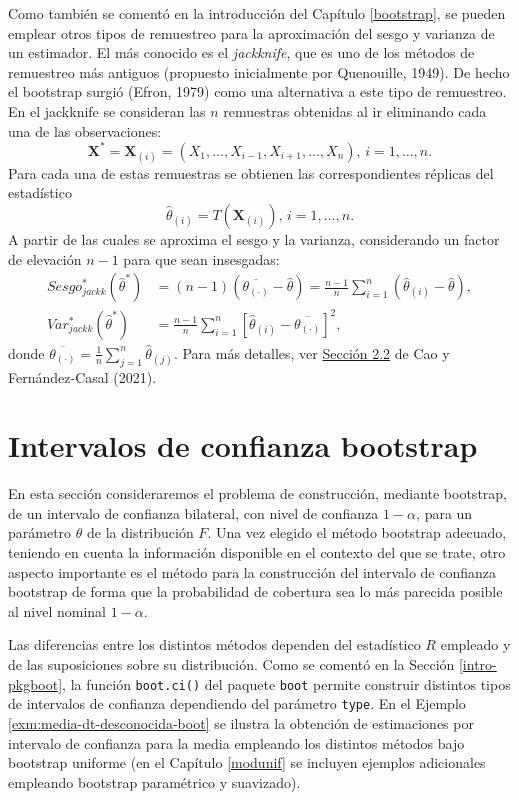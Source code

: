 \documentclass[
  spanish,
  10pt,
]{book}
\renewcommand{\mathbf}[1]{\symbf{#1}}
\theoremstyle{break}
\theoremstyle{nonumberplain}
\begin{document}
Como también se comentó en la introducción del Capítulo \ref{bootstrap}, se pueden emplear otros tipos de remuestreo para la aproximación del sesgo y varianza de un estimador.
El más conocido es el \emph{jackknife}, que es uno de los métodos de remuestreo más antiguos (propuesto inicialmente por Quenouille, 1949).
De hecho el bootstrap surgió (Efron, 1979) como una alternativa a este tipo de remuestreo.
En el jackknife se consideran las \(n\) remuestras obtenidas al ir eliminando cada una de las observaciones:
\[\mathbf{X}^{\ast}= \mathbf{X}_{(i)}=\left( X_1,\ldots ,X_{i-1},X_{i+1},\ldots
,X_n \right) \text{,  } i=1,\ldots ,n.\]
Para cada una de estas remuestras se obtienen las correspondientes réplicas del estadístico
\[\hat \theta_{(i)} = T \left( \mathbf{X}_{(i)} \right) \text{,  } i=1,\ldots ,n.\]
A partir de las cuales se aproxima el sesgo y la varianza, considerando un factor de elevación \(n-1\) para que sean insesgadas:
\[\begin{aligned}
Sesgo_{jackk}^{\ast}\left( \hat{\theta}^{\ast} \right) 
&= \left( n-1 \right)\left( \overline{\theta_{(\cdot)}}-\hat{\theta} \right) 
= \frac{n-1}{n}\sum_{i=1}^{n}\left( \hat \theta_{(i)} - \hat{\theta} \right), \\
Var_{jackk}^{\ast}\left( \hat{\theta}^{\ast} \right) 
&= \frac{n-1}{n} \sum_{i=1}^{n}\left[ \hat \theta_{(i)} 
- \overline{\theta_{(\cdot)}}\right]^2,
\end{aligned}\]
donde \(\overline{\theta_{(\cdot)}} = \frac{1}{n}\sum_{j=1}^{n}\hat \theta_{(j)}\).
Para más detalles, ver \href{https://rubenfcasal.github.io/book_remuestreo/jackknife.html}{Sección 2.2} de Cao y Fernández-Casal (2021).

\section{Intervalos de confianza bootstrap}\label{boot-ic}

En esta sección consideraremos el problema de construcción, mediante bootstrap, de un intervalo de confianza bilateral, con nivel de confianza \(1-\alpha\), para un parámetro \(\theta\) de la distribución \(F\).
Una vez elegido el método bootstrap adecuado, teniendo en cuenta la información disponible en el contexto del que se trate, otro aspecto importante es el método para la construcción del intervalo de confianza bootstrap de forma que la probabilidad de cobertura sea lo más parecida posible al nivel nominal \(1-\alpha\).

Las diferencias entre los distintos métodos dependen del estadístico \(R\) empleado y de las suposiciones sobre su distribución.
Como se comentó en la Sección \ref{intro-pkgboot}, la función \texttt{boot.ci()} del paquete \texttt{boot} permite construir distintos tipos de intervalos de confianza dependiendo del parámetro \texttt{type}.
En el Ejemplo \ref{exm:media-dt-desconocida-boot} se ilustra la obtención de estimaciones por intervalo de confianza para la media empleando los distintos métodos bajo bootstrap uniforme (en el Capítulo \ref{modunif} se incluyen ejemplos adicionales empleando bootstrap paramétrico y suavizado).
\end{document}
